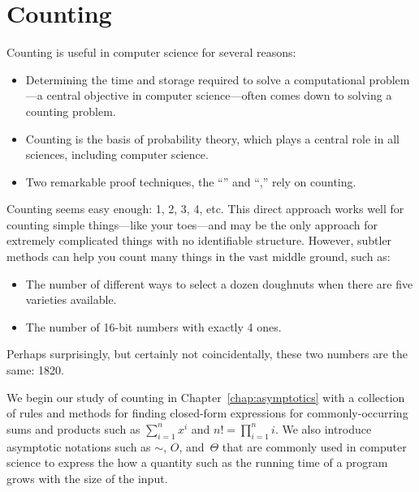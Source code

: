 \part{Counting}
\label{part:counting}

\partintro
{}


Counting is useful in computer science for several reasons:
\begin{itemize}

\item

Determining the time and storage required to solve a computational
problem---a central objective in computer science---often comes down
to solving a counting problem.

\item

Counting is the basis of probability theory, which plays a central
role in all sciences, including computer science.

\item

Two remarkable proof techniques, the ``''
and ``,'' rely on counting.
\iffalse
These lead to a variety of interesting and useful insights.
\fi

\end{itemize}

Counting seems easy enough: 1, 2, 3, 4, etc.  This direct approach
works well for counting simple things---like your toes---and may be
the only approach for extremely complicated things with no
identifiable structure.  However, subtler methods can help you count
many things in the vast middle ground, such as:
\begin{itemize}

\item The number of different ways to select a dozen doughnuts when
there are five varieties available.

\item The number of 16-bit numbers with exactly 4 ones.

\end{itemize}
Perhaps surprisingly, but certainly not coincidentally, these two
numbers are the same: 1820.

We begin our study of counting in Chapter~\ref{chap:asymptotics} with
a collection of rules and methods for finding closed-form expressions
for commonly-occurring sums and products such as $\sum_{i = 1}^n x^i$
and $n! = \prod_{i=1}^n i$.  We also introduce asymptotic notations
such as $\sim$, $O$, and~$\Theta$ that are commonly used in computer
science to express the how a quantity such as the running time of a
program grows with the size of the input.

